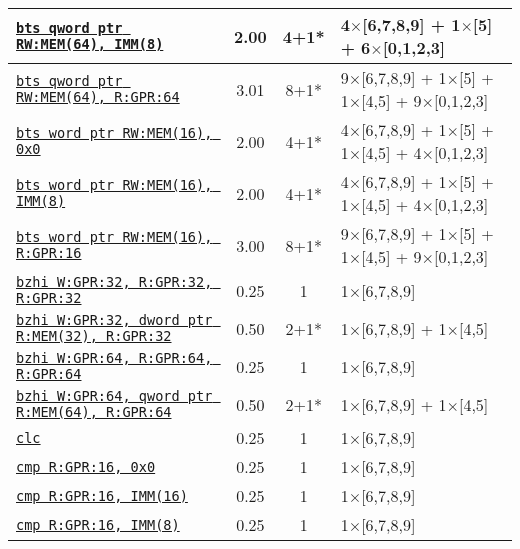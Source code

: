 \documentclass[a4paper,english,fontsize=9]{scrartcl}
\begin{document}
\begin{longtable}{p{}ccL{.25\textwidth}}
  \midrule
  \texttt{\href{https://felixcloutier.com/x86/BTS.html}{bts qword ptr RW:MEM(64), IMM(8)}} & 2.00 & 4+1* & 4\(\times\)[6,7,8,9] + 1\(\times\)[5] + 6\(\times\)[0,1,2,3] \\
  \midrule
  \texttt{\href{https://felixcloutier.com/x86/BTS.html}{bts qword ptr RW:MEM(64), R:GPR:64}} & 3.01 & 8+1* & 9\(\times\)[6,7,8,9] + 1\(\times\)[5] + 1\(\times\)[4,5] + 9\(\times\)[0,1,2,3] \\
  \midrule
  \texttt{\href{https://felixcloutier.com/x86/BTS.html}{bts word ptr RW:MEM(16), 0x0}} & 2.00 & 4+1* & 4\(\times\)[6,7,8,9] + 1\(\times\)[5] + 1\(\times\)[4,5] + 4\(\times\)[0,1,2,3] \\
  \midrule
  \texttt{\href{https://felixcloutier.com/x86/BTS.html}{bts word ptr RW:MEM(16), IMM(8)}} & 2.00 & 4+1* & 4\(\times\)[6,7,8,9] + 1\(\times\)[5] + 1\(\times\)[4,5] + 4\(\times\)[0,1,2,3] \\
  \midrule
  \texttt{\href{https://felixcloutier.com/x86/BTS.html}{bts word ptr RW:MEM(16), R:GPR:16}} & 3.00 & 8+1* & 9\(\times\)[6,7,8,9] + 1\(\times\)[5] + 1\(\times\)[4,5] + 9\(\times\)[0,1,2,3] \\
  \midrule
  \texttt{\href{https://felixcloutier.com/x86/BZHI.html}{bzhi W:GPR:32, R:GPR:32, R:GPR:32}} & 0.25 & 1 & 1\(\times\)[6,7,8,9] \\
  \midrule
  \texttt{\href{https://felixcloutier.com/x86/BZHI.html}{bzhi W:GPR:32, dword ptr R:MEM(32), R:GPR:32}} & 0.50 & 2+1* & 1\(\times\)[6,7,8,9] + 1\(\times\)[4,5] \\
  \midrule
  \texttt{\href{https://felixcloutier.com/x86/BZHI.html}{bzhi W:GPR:64, R:GPR:64, R:GPR:64}} & 0.25 & 1 & 1\(\times\)[6,7,8,9] \\
  \midrule
  \texttt{\href{https://felixcloutier.com/x86/BZHI.html}{bzhi W:GPR:64, qword ptr R:MEM(64), R:GPR:64}} & 0.50 & 2+1* & 1\(\times\)[6,7,8,9] + 1\(\times\)[4,5] \\
  \midrule
  \texttt{\href{https://felixcloutier.com/x86/CLC.html}{clc}} & 0.25 & 1 & 1\(\times\)[6,7,8,9] \\
  \midrule
  \texttt{\href{https://felixcloutier.com/x86/CMP.html}{cmp R:GPR:16, 0x0}} & 0.25 & 1 & 1\(\times\)[6,7,8,9] \\
  \midrule
  \texttt{\href{https://felixcloutier.com/x86/CMP.html}{cmp R:GPR:16, IMM(16)}} & 0.25 & 1 & 1\(\times\)[6,7,8,9] \\
  \midrule
  \texttt{\href{https://felixcloutier.com/x86/CMP.html}{cmp R:GPR:16, IMM(8)}} & 0.25 & 1 & 1\(\times\)[6,7,8,9] \\

\end{longtable}
\end{document}
